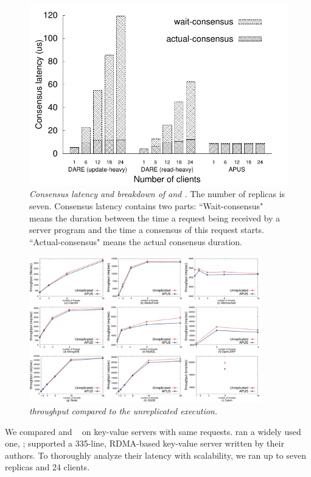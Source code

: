 \begin{figure}[t]
\centering
\vspace{-.10in}
\includegraphics[width=.4\textwidth]{figures/server-processing-compare}
\vspace{-.1in}
\caption{{\em Consensus latency and breakdown of \xxx and \dare.} The 
number of replicas is seven. Consensus latency contains two parts: 
``Wait-consensus" means the duration between the time a request being received 
by a server program and the time a consensus of this request starts. 
``Actual-consensus" means the actual consensus duration.}
\label{fig:compare}
\vspace{-.25in}
\end{figure}


\begin{figure}[t]
\centering
\includegraphics[width=0.9\textwidth]{figures/throughput}
\vspace{-.10in}
\caption{\small {\em \xxx throughput compared to the unreplicated
execution.}}
\vspace{-.20in}
\label{fig:tput}
\end{figure}

We compared \xxx and \dare~\cite{dare:hpdc15} on key-value servers with same 
requests. \xxx ran a widely used one, \redis; \dare supported a 335-line, 
RDMA-based key-value server written by their authors. To thoroughly analyze 
their latency with scalability, we ran up to seven replicas and 24 clients. 

